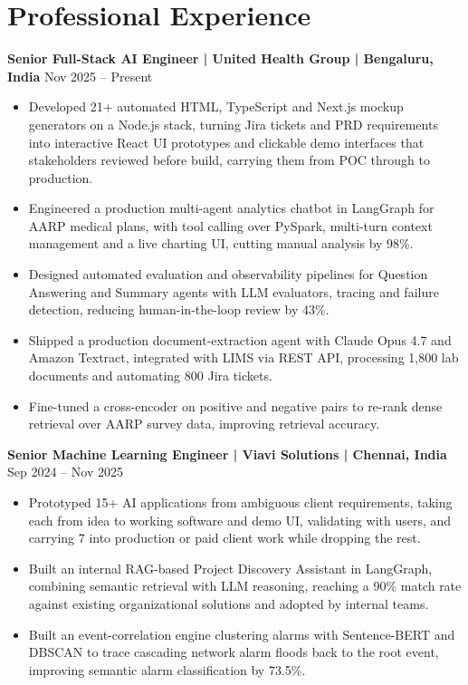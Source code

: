 \documentclass[10pt,a4paper]{article}
\newcommand{\role}[2]{\textbf{#1} \hfill #2\par}
\begin{document}
\section{Professional Experience}
\role{Senior Full-Stack AI Engineer | United Health Group | Bengaluru, India}{Nov 2025 -- Present}
\begin{itemize}
  \item Developed 21+ automated HTML, TypeScript and Next.js mockup generators on a Node.js stack, turning Jira
  tickets and PRD requirements into interactive React UI prototypes and clickable demo interfaces that stakeholders
  reviewed before build, carrying them from POC through to production.
  \item Engineered a production multi-agent analytics chatbot in LangGraph for AARP medical plans, with tool calling
  over PySpark, multi-turn context management and a live charting UI, cutting manual analysis by 98\%.
  \item Designed automated evaluation and observability pipelines for Question Answering and Summary agents with LLM
  evaluators, tracing and failure detection, reducing human-in-the-loop review by 43\%.
  \item Shipped a production document-extraction agent with Claude Opus 4.7 and Amazon Textract, integrated with LIMS
  via REST API, processing 1,800 lab documents and automating 800 Jira tickets.
  \item Fine-tuned a cross-encoder on positive and negative pairs to re-rank dense retrieval over AARP survey data,
  improving retrieval accuracy.
\end{itemize}
\vspace{3pt}

\role{Senior Machine Learning Engineer | Viavi Solutions | Chennai, India}{Sep 2024 -- Nov 2025}
\begin{itemize}
  \item Prototyped 15+ AI applications from ambiguous client requirements, taking each from idea to working software
  and demo UI, validating with users, and carrying 7 into production or paid client work while dropping the rest.
  \item Built an internal RAG-based Project Discovery Assistant in LangGraph, combining semantic retrieval with LLM
  reasoning, reaching a 90\% match rate against existing organizational solutions and adopted by internal teams.
  \item Built an event-correlation engine clustering alarms with Sentence-BERT and DBSCAN to trace cascading network
  alarm floods back to the root event, improving semantic alarm classification by 73.5\%.
\end{itemize}
\vspace{3pt}
\end{document}

